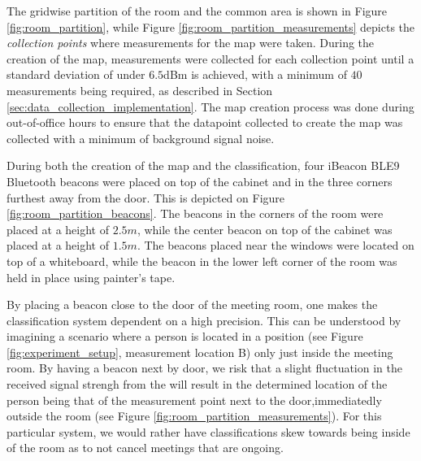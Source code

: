 The gridwise partition of the room and the common area is shown in Figure \ref{fig:room_partition}, while Figure \ref{fig:room_partition_measurements} depicts the \textit{collection points} where measurements for the map were taken.
During the creation of the map, measurements were collected for each collection point until a standard deviation of under $6.5$dBm is achieved, with a minimum of $40$ measurements being required, as described in Section \ref{sec:data_collection_implementation}.
The map creation process was done during out-of-office hours to ensure that the datapoint collected to create the map was collected with a minimum of background signal noise.

During both the creation of the map and the classification, four iBeacon BLE9 Bluetooth beacons \cite{BluetoothiBeaconBLE9} were placed on top of the cabinet and in the three corners furthest away from the door. This is depicted on Figure \ref{fig:room_partition_beacons}.
The beacons in the corners of the room were placed at a height of $2.5m$, while the center beacon on top of the cabinet was placed at a height of $1.5m$.
The beacons placed near the windows were located on top of a whiteboard, while the beacon in the lower left corner of the room was held in place using painter's tape.

By placing a beacon close to the door of the meeting room, one makes the classification system dependent on a high precision.
This can be understood by imagining a scenario where a person is located in a position (see Figure \ref{fig:experiment_setup}, measurement location B) only just inside the meeting room.
By having a beacon next by door, we risk that a slight fluctuation in the received signal strengh from the will result in the determined location of the person being that of the measurement point next to the door,immediatedly outside the room (see Figure \ref{fig:room_partition_measurements}).
For this particular system, we would rather have classifications skew towards being inside of the room as to not cancel meetings that are ongoing.